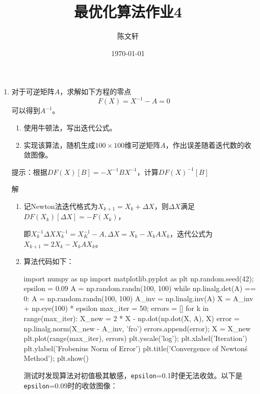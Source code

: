 \documentclass[cn,hazy,cyan,11pt,normal]{elegantnote}
\title{最优化算法作业4}
\author{陈文轩}
\date{\today}
\begin{document}
    \maketitle

    \begin{enumerate}
        \item {\color{c1}对于可逆矩阵$A$，求解如下方程的零点\[F(X)=X^{-1}-A=0\]可以得到$A^{-1}$。
            \begin{enumerate}
                \item 使用牛顿法，写出迭代公式。
                \item 实现该算法，随机生成$100\times 100$维可逆矩阵$A$，作出误差随着迭代数的收敛图像。
            \end{enumerate}

            提示：根据$DF(X)[B]=-X^{-1}BX^{-1}$，计算$DF(X)^{-1}[B]$}

            \vspace{0.5cm}\textcolor{c2}{解}

            \begin{enumerate}
                \item 记Newton法迭代格式为$X_{k+1}=X_k+\Delta X$，则$\Delta X$满足$DF(X_k)[\Delta X]=-F(X_k)$，

                即$X_k^{-1}\Delta X X_k^{-1}=X_K^{-1}-A,\Delta X=X_k-X_k AX_k$，迭代公式为$X_{k+1}=2X_k-X_k AX_k$。\vspace{0.5cm}
                \item 算法代码如下：
                    \begin{code}[Newton法代码]
import numpy as np
import matplotlib.pyplot as plt
np.random.seed(42); epsilon = 0.09
A = np.random.randn(100, 100)
while np.linalg.det(A) == 0:
    A = np.random.randn(100, 100)
A_inv = np.linalg.inv(A)
X = A_inv + np.eye(100) * epsilon
max_iter = 50; errors = []
for k in range(max_iter):
    X_new = 2 * X - np.dot(np.dot(X, A), X)
    error = np.linalg.norm(X_new - A_inv, 'fro')
    errors.append(error); X = X_new
plt.plot(range(max_iter), errors)
plt.yscale('log'); plt.xlabel('Iteration')
plt.ylabel('Frobenius Norm of Error')
plt.title('Convergence of Newton\'s Method'); plt.show()
                    \end{code}

                    测试时发现算法对初值极其敏感，\texttt{epsilon}=0.1时便无法收敛。以下是\texttt{epsilon}=0.09时的收敛图像：


\end{enumerate}
\end{enumerate}
\end{document}
